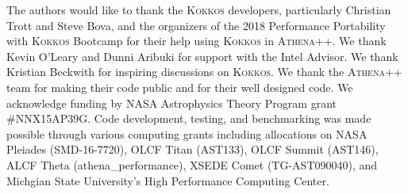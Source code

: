 \documentclass[10pt,journal,compsoc]{IEEEtran}
\newcommand{\textcode}[1]{\textsc{#1}}
\newcommand{\kokkos}{\textcode{Kokkos}\xspace}
\newcommand{\athena}{\textcode{Athena++}\xspace}
\begin{document}
The authors would like to thank 
the \kokkos developers, particularly Christian Trott and Steve Bova, and the
organizers of the 2018 Performance Portability with \kokkos Bootcamp for
their help using \kokkos in \athena.
We thank Kevin O'Leary and Dunni Aribuki for support with the Intel Advisor.
We thank Kristian Beckwith for inspiring discussions on \kokkos.
We thank the \athena team for making
their code public and for their well designed code.  
We acknowledge funding by NASA Astrophysics Theory Program grant \#NNX15AP39G.
Code development, testing, and benchmarking was made possible through various
computing grants including allocations on NASA Pleiades (SMD-16-7720), 
OLCF Titan (AST133), OLCF Summit (AST146), ALCF Theta (athena\_performance),
XSEDE Comet (TG-AST090040), 
and Michgian State University's High Performance Computing Center.

\ifCLASSOPTIONcaptionsoff
  \newpage
\fi






%

%
%
%

% 
\end{document}
